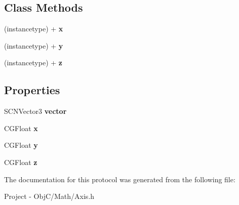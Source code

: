 \subsection*{Class Methods}
\begin{DoxyCompactItemize}
\item 
\hypertarget{protocol_axis_export-p_a4dda38bca042b628df9523dd14e1ae35}{}(instancetype) + {\bfseries x}\label{protocol_axis_export-p_a4dda38bca042b628df9523dd14e1ae35}

\item 
\hypertarget{protocol_axis_export-p_ab8ae31c48df902d196dcb8719eb09a50}{}(instancetype) + {\bfseries y}\label{protocol_axis_export-p_ab8ae31c48df902d196dcb8719eb09a50}

\item 
\hypertarget{protocol_axis_export-p_a821221bdfcd34eaf9af3906860df1222}{}(instancetype) + {\bfseries z}\label{protocol_axis_export-p_a821221bdfcd34eaf9af3906860df1222}

\end{DoxyCompactItemize}
\subsection*{Properties}
\begin{DoxyCompactItemize}
\item 
\hypertarget{protocol_axis_export-p_a638ca882e59393aeb7fb580de7f07427}{}S\+C\+N\+Vector3 {\bfseries vector}\label{protocol_axis_export-p_a638ca882e59393aeb7fb580de7f07427}

\item 
\hypertarget{protocol_axis_export-p_ada6cf6d58bf33dec7ebdc49410799e7a}{}C\+G\+Float {\bfseries x}\label{protocol_axis_export-p_ada6cf6d58bf33dec7ebdc49410799e7a}

\item 
\hypertarget{protocol_axis_export-p_ae3c9224ec98aee6734b4fa62930ba11c}{}C\+G\+Float {\bfseries y}\label{protocol_axis_export-p_ae3c9224ec98aee6734b4fa62930ba11c}

\item 
\hypertarget{protocol_axis_export-p_a039018a4399b9d2dca2b24848ea7c738}{}C\+G\+Float {\bfseries z}\label{protocol_axis_export-p_a039018a4399b9d2dca2b24848ea7c738}

\end{DoxyCompactItemize}


The documentation for this protocol was generated from the following file\+:\begin{DoxyCompactItemize}
\item 
Project -\/ Obj\+C/\+Math/Axis.\+h\end{DoxyCompactItemize}
